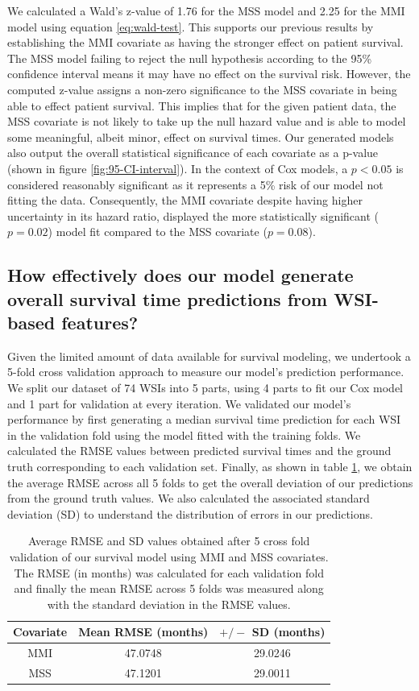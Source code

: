 \documentclass{l4proj}
\begin{document}
We calculated a Wald's z-value of 1.76 for the MSS model and 2.25 for the MMI model using equation \ref{eq:wald-test}. This supports our previous results by establishing the MMI covariate as having the stronger effect on patient survival. The MSS model failing to reject the null hypothesis according to the 95\% confidence interval means it may have no effect on the survival risk. However, the computed z-value assigns a non-zero significance to the MSS covariate in being able to effect patient survival. This implies that for the given patient data, the MSS covariate is not likely to take up the null hazard value and is able to model some meaningful, albeit minor, effect on survival times. Our generated models also output the overall statistical significance of each covariate as a p-value (shown in figure \ref{fig:95-CI-interval}). In the context of Cox models, a $p<0.05$ is considered reasonably significant as it represents a 5\% risk of our model not fitting the data. Consequently, the MMI covariate despite having higher uncertainty in its hazard ratio, displayed the more statistically significant ($p=0.02$) model fit compared to the MSS covariate ($p=0.08$).

\subsection{How effectively does our model generate overall survival time predictions from WSI-based features?}
Given the limited amount of data available for survival modeling, we  undertook a 5-fold cross validation approach to measure our model's prediction performance. We split our dataset of 74 WSIs into 5 parts, using 4 parts to fit our Cox model and 1 part for validation at every iteration. We validated our model's performance by first generating a median survival time prediction for each WSI in the validation fold using the model fitted with the training folds. We calculated the RMSE values between predicted survival times and the ground truth corresponding to each validation set. Finally, as shown in table \ref{tab:cross-val-results},  we obtain the average RMSE across all 5 folds to get the overall deviation of our predictions from the ground truth values. We also calculated the associated standard deviation (SD) to understand the distribution of errors in our predictions.   

\begin{table}[h]
    \centering
    \begin{tabular}{c|c|c}
    \hline
     Covariate & Mean RMSE (months) & \(+/-\) SD (months)   \\ \hline
     MMI & 47.0748 & 29.0246 \\
     MSS & 47.1201 & 29.0011 \\
    \end{tabular}
    \caption{Average RMSE and SD values obtained after 5 cross fold validation of our survival model using MMI and MSS covariates. The RMSE (in months) was calculated for each validation fold and finally the mean RMSE across 5 folds was measured along with the standard deviation in the RMSE values.}
    \label{tab:cross-val-results}
\end{table}
\end{document}
